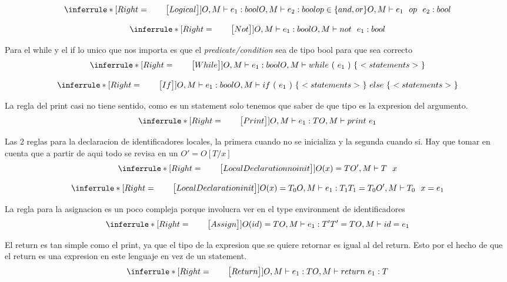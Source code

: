 \documentclass[12pt]{report}
\begin{document}
$$\inferrule* [Right=\quad\quad\big [Logical\big{]}]{
O,M \vdash e_1 : bool \\\\
O,M \vdash e_2 : bool \\\\
op \in \{and,or\}
}{O,M \vdash e_{1}\ \  op\ \  e_{2}: bool}$$

$$\inferrule* [Right=\quad\quad\big [Not\big{]}]{
O,M \vdash e_1 : bool
}{O,M \vdash not\ \  e_1: bool}$$

Para el while y el if lo unico que nos importa es que el \textit{predicate/condition} sea de tipo bool para que sea correcto
$$\inferrule* [Right=\quad\quad\big [While\big{]}]{
O,M \vdash e_1 : bool
}{O,M \vdash while\  (\  e_1\  )\   \{\  <statements>\  \}}$$

$$\inferrule* [Right=\quad\quad\big [If\big{]}]{
O,M \vdash e_1 : bool
}{O,M \vdash if\  (\  e_1\  )\   \{\  <statements>\  \}\  else\  \{\  <statements>\  \}}$$

La regla del print casi no tiene sentido, como es un statement solo tenemos que saber de que tipo es la expresion del argumento.
$$\inferrule* [Right=\quad\quad\big [Print\big{]}]{
O,M \vdash e_1 : T
}{O,M \vdash print\  e_1}$$

Las 2 reglas para la declaracion de identificadores locales, la primera cuando no se inicializa y la segunda cuando si. Hay que tomar en cuenta que a partir de aqui todo se revisa en un $O' = O[T/x]$  
$$\inferrule* [Right=\quad\quad\big [LocalDeclaration no init\big{]}]{O(x) = T}{O',M \vdash T \ \  x}$$

$$\inferrule* [Right=\quad\quad\big [LocalDeclaration init\big{]}]{O(x) = T_0 \\\\ O,M \vdash e_1:T_1 \\\\
T_1 = T_0
}{O',M \vdash T_0 \ \  x = e_1}$$

La regla para la asignacion es un poco compleja porque involucra ver en el type environment de identificadores
$$\inferrule* [Right=\quad\quad\big [Assign\big{]}]{
O(id) = T \\\\
O,M \vdash e_1 : T'\\\\
T' = T
}{O,M \vdash id = e_1}$$

El return es tan simple como el print, ya que el tipo de la expresion que se quiere retornar es igual al del return. Esto por el hecho de que el return es una expresion en este lenguaje en vez de un statement.
$$\inferrule* [Right=\quad\quad\big [Return\big{]}]{
O,M \vdash e_1 : T
}{O,M \vdash return\  e_1 : T}$$
\end{document}
